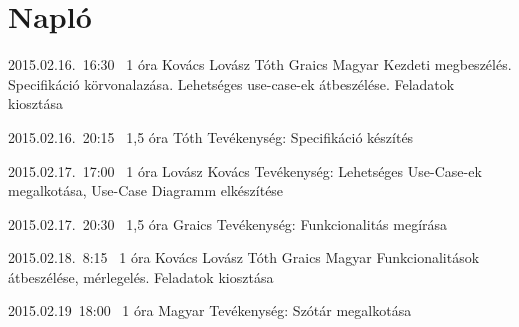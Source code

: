 %
\section{Napló}

\begin{naplo}

\bejegyzes
{2015.02.16.~16:30~} %
{1 óra} %
{Kovács\newline
Lovász\newline
Tóth\newline
Graics\newline
Magyar
} %
{Kezdeti megbeszélés. Specifikáció körvonalazása. Lehetséges use-case-ek átbeszélése. Feladatok kiosztása} %

\bejegyzes
{2015.02.16.~20:15~}
{1,5 óra}
{Tóth}
{Tevékenység: Specifikáció készítés}

\bejegyzes
{2015.02.17.~17:00~}
{1 óra}
{Lovász\newline
Kovács}
{Tevékenység: Lehetséges Use-Case-ek megalkotása, Use-Case Diagramm elkészítése}

\bejegyzes
{2015.02.17.~20:30~}
{1,5 óra}
{Graics}
{Tevékenység: Funkcionalitás megírása}

\bejegyzes
{2015.02.18.~8:15~} %
{1 óra} %
{Kovács\newline
Lovász\newline
Tóth\newline
Graics\newline
Magyar
} %
{Funkcionalitások átbeszélése, mérlegelés. Feladatok kiosztása}


\bejegyzes
{2015.02.19~18:00~}
{1 óra}
{Magyar}
{Tevékenység: Szótár megalkotása}

\end{naplo}